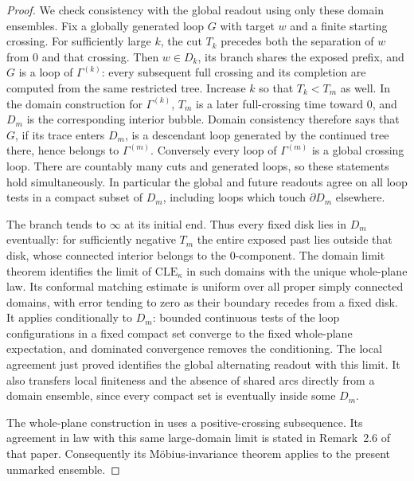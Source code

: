 \begin{proof}
We check consistency with the global readout using only these domain
ensembles.  Fix a globally generated loop $G$ with target $w$ and a
finite starting crossing.  For sufficiently large $k$, the cut $T_k$
precedes both the separation of $w$ from $0$ and that crossing.  Then
$w\in D_k$, its branch shares the exposed prefix, and $G$ is a loop
of $\Gamma^{(k)}$: every subsequent full crossing and its completion
are computed from the same restricted tree.  Increase $k$ so that
$T_k<T_m$ as well.  In the domain construction for $\Gamma^{(k)}$,
$T_m$ is a later full-crossing time toward $0$, and $D_m$ is the
corresponding interior bubble.  Domain consistency therefore says
that $G$, if its trace enters $D_m$, is a descendant loop generated by
the continued tree there, hence belongs to $\Gamma^{(m)}$.
Conversely every loop of $\Gamma^{(m)}$ is a global crossing loop.
There are countably many cuts and generated loops, so these statements
hold simultaneously.  In particular the global and future readouts
agree on all loop tests in a compact subset of $D_m$, including loops
which touch $\partial D_m$ elsewhere.

The branch tends to $\infty$ at its initial end.  Thus every fixed disk
lies in $D_m$ eventually: for sufficiently negative $T_m$ the entire
exposed past lies outside that disk, whose connected interior belongs
to the $0$-component.  The domain limit theorem
\cite[Theorem~A.1]{MillerWatsonWilsonNestingField} identifies the limit
of $\mathrm{CLE}_{\kappa}$ in such domains with the unique whole-plane
law.  Its conformal matching estimate is uniform over all proper simply
connected domains, with error tending to zero as their boundary recedes
from a fixed disk.  It applies conditionally to $D_m$: bounded
continuous tests of the loop configurations in a fixed compact set
converge to the fixed whole-plane expectation, and dominated convergence
removes the conditioning.  The local agreement just proved identifies
the global alternating readout with this limit.  It also transfers
local finiteness and the absence of shared arcs directly from a domain
ensemble, since every compact set is eventually inside some $D_m$.

The whole-plane construction in \cite[Section~2.3.2]{GwynneMillerQianCLE}
uses a positive-crossing subsequence.  Its agreement in law with this
same large-domain limit is stated in Remark~2.6 of that paper.
Consequently its M\"obius-invariance theorem
\cite[Theorem~1.1]{GwynneMillerQianCLE} applies to the present unmarked
ensemble.
\end{proof}

